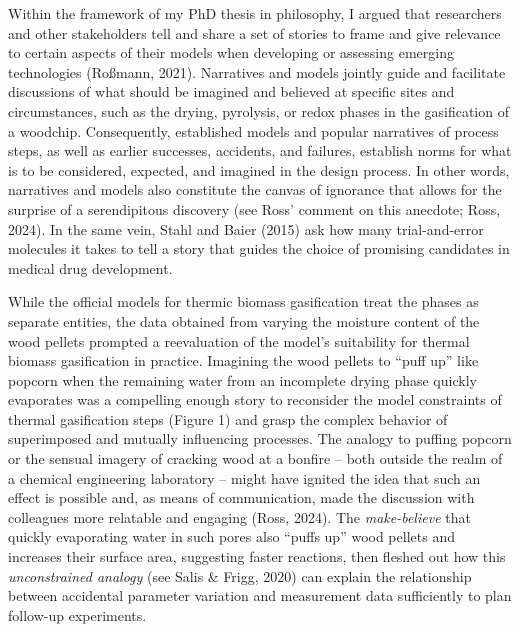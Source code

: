 \documentclass[authordate, anecdote]{jote-new-article}
\begin{document}
	Within the framework of my PhD thesis in philosophy, I argued that researchers and other stakeholders tell and share a set of stories to frame and give relevance to certain aspects of their models when developing or assessing emerging technologies (Roßmann, 2021). Narratives and models jointly guide and facilitate discussions of what should be imagined and believed at specific sites and circumstances, such as the drying, pyrolysis, or redox phases in the gasification of a woodchip. Consequently, established models and popular narratives of process steps, as well as earlier successes, accidents, and failures, establish norms for what is to be considered, expected, and imagined in the design process. In other words, narratives and models also constitute the canvas of ignorance that allows for the surprise of a serendipitous discovery (see Ross' comment on this anecdote; Ross, 2024). In the same vein, Stahl and Baier (2015) ask how many trial-and-error molecules it takes to tell a story that guides the choice of promising candidates in medical drug development.



	While the official models for thermic biomass gasification treat the phases as separate entities, the data obtained from varying the moisture content of the wood pellets prompted a reevaluation of the model's suitability for thermal biomass gasification in practice. Imagining the wood pellets to “puff up” like popcorn when the remaining water from an incomplete drying phase quickly evaporates was a compelling enough story to reconsider the model constraints of thermal gasification steps (Figure 1) and grasp the complex behavior of superimposed and mutually influencing processes. The analogy to puffing popcorn or the sensual imagery of cracking wood at a bonfire -- both outside the realm of a chemical engineering laboratory -- might have ignited the idea that such an effect is possible and, as means of communication, made the discussion with colleagues more relatable and engaging (Ross, 2024). The \emph{make-believe} that quickly evaporating water in such pores also “puffs up” wood pellets and increases their surface area, suggesting faster reactions, then fleshed out how this \emph{unconstrained analogy }(see Salis \& Frigg, 2020) can explain the relationship between accidental parameter variation and measurement data sufficiently to plan follow-up experiments.
\end{document}
